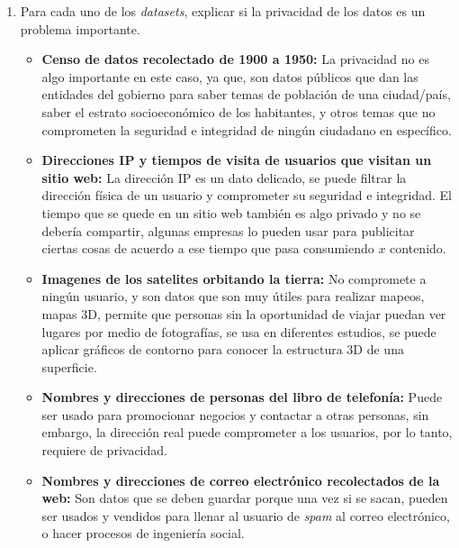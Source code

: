 \documentclass{article}
\begin{document}
\begin{enumerate}
\begin{itemize}
        \end{itemize}
  \item Para cada uno de los \textit{datasets}, explicar si la privacidad de los datos es un problema importante.
        \begin{itemize}
          \item \textbf{Censo de datos recolectado de 1900 a 1950:} La privacidad no es algo importante en este caso, ya que, son datos públicos que dan las entidades del gobierno para saber temas de población de una ciudad/país, saber el estrato socioeconómico de los habitantes, y otros temas que no comprometen la seguridad e integridad de ningún ciudadano en específico.
          \item \textbf{Direcciones IP y tiempos de visita de usuarios que visitan un sitio web:} La dirección IP es un dato delicado, se puede filtrar la dirección física de un usuario y comprometer su seguridad e integridad. El tiempo que se quede en un sitio web también es algo privado y no se debería compartir, algunas empresas lo pueden usar para publicitar ciertas cosas de acuerdo a ese tiempo que pasa consumiendo \(x\) contenido.
          \item \textbf{Imagenes de los satelites orbitando la tierra:} No compromete a ningún usuario, y son datos que son muy útiles para realizar mapeos, mapas 3D, permite que personas sin la oportunidad de viajar puedan ver lugares por medio de fotografías, se usa en diferentes estudios, se puede aplicar gráficos de contorno para conocer la estructura 3D de una superficie.
          \item \textbf{Nombres y direcciones de personas del libro de telefonía:} Puede ser usado para promocionar negocios y contactar a otras personas, sin embargo, la dirección real puede comprometer a los usuarios, por lo tanto, requiere de privacidad.
          \item \textbf{Nombres y direcciones de correo electrónico recolectados de la web:} Son datos que se deben guardar porque una vez si se sacan, pueden ser usados y vendidos para llenar al usuario de \textit{spam} al correo electrónico, o hacer procesos de ingeniería social.
        \end{itemize}
\end{enumerate}
\end{document}
